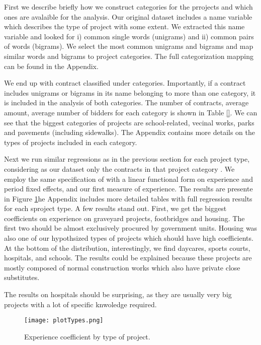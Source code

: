 First we describe briefly how we construct categories for the prrojects and which ones are avalaible for the analysis. Our original dataset includes a name variable which describes the type of project with some extent. We extracted this name variable and looked for i) common single words (unigrams) and ii) common pairs of words (bigrams). We select the most common unigrams and bigrams and map similar words and bigrams to project categories. The full categorization mapping can be found in the Appendix.

We end up with contract classified under categories. Importantly, if a contract includes unigrams or bigrams in its name belonging to more than one category, it is included in the analysis of both categories. The number of contracts, average amount, average number of bidders for each category is shown in Table \ref{}. We can see that the biggest categories of projects are school-related, vecinal works, parks and pavements (including sidewalks). The Appendix contains more details on the types of projects included in each category.

%

Next we run similar regressions as in the previous section for each project type, considering as our dataset only the contracts in that project category . We employ the same specification of with a linear functional form on experience and period fixed effects, and our first measure of experience. The results are presente in Figure \ref{fig:typeestimates}he Appendix includes more detailed tables with full regression results for each sproject type. A few results stand out. First, we get the biggest coefficients on experience on graveyard projects, footbridges and housing. The first two should be almost exclusively procured by government units. Housing was also one of our hypothsized types of projects which should have high coefficients. At the bottom of the distribution, interestingly, we find daycares, sports courts, hospitals, and schools. The results could be explained because these projects are mostly composed of normal construction works which also have private close substitutes.

The results on hospitals should be surprising, as they are usually very big projects with a lot of specific knwoledge required.

%

\begin{figure}
  \texttt{[image: plotTypes.png]}
  \caption{Experience coefficient by type of project.}
  \label{fig:typeestimates}
\end{figure}

